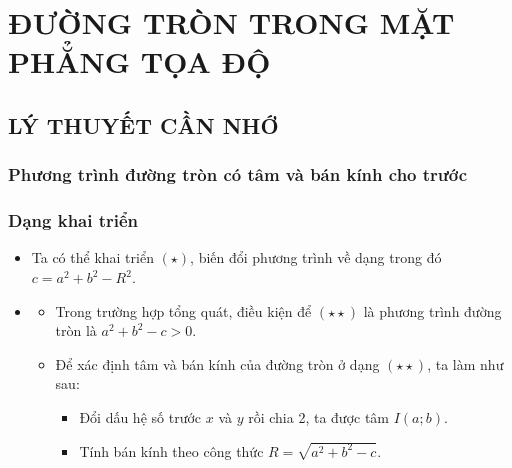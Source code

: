 \section{ĐƯỜNG TRÒN TRONG MẶT PHẲNG TỌA ĐỘ}
\subsection{LÝ THUYẾT CẦN NHỚ}
\subsubsection{Phương trình đường tròn có tâm và bán kính cho trước}
\subsubsection{Dạng khai triển}
\begin{itemize}
	\item [\iconMT]   Ta có thể khai triển $(\star)$, biến đổi phương trình về dạng 
	trong đó $c=a^2+b^2-R^2$.
	\item [\iconMT] 
	\begin{gachsoc}
		\begin{itemize}
			\item [\ding{172}] Trong trường hợp tổng quát, điều kiện để $(\star \star)$ là phương trình đường tròn là $a^2+b^2-c>0$.
			\item [\ding{173}] Để xác định tâm và bán kính của đường tròn ở dạng $(\star \star)$, ta làm như sau:
			\begin{itemize}
				\item Đổi dấu hệ số trước $x$ và $y$ rồi chia 2, ta được tâm $I(a;b)$.
				\item Tính bán kính theo công thức $R=\sqrt{a^2+b^2-c}$. 
			\end{itemize}
		\end{itemize}
	\end{gachsoc}
\end{itemize}


